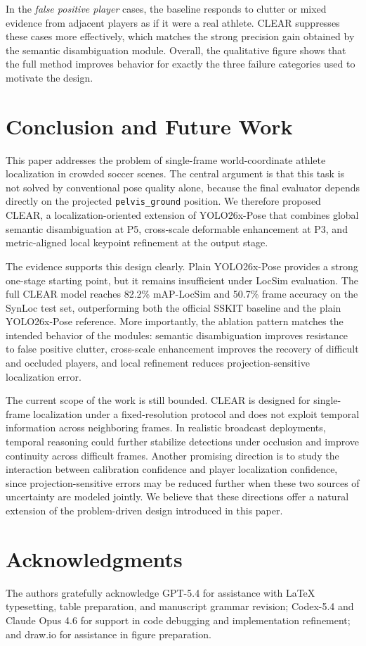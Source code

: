 \documentclass[runningheads]{llncs}
\begin{document}
In the \emph{false positive player} cases, the baseline responds to clutter or mixed evidence from adjacent players as if it were a real athlete. CLEAR suppresses these cases more effectively, which matches the strong precision gain obtained by the semantic disambiguation module. Overall, the qualitative figure shows that the full method improves behavior for exactly the three failure categories used to motivate the design.

\section{Conclusion and Future Work}
\label{sec:conclusion}

This paper addresses the problem of single-frame world-coordinate athlete localization in crowded soccer scenes. The central argument is that this task is not solved by conventional pose quality alone, because the final evaluator depends directly on the projected \texttt{pelvis\_ground} position. We therefore proposed CLEAR, a localization-oriented extension of YOLO26x-Pose that combines global semantic disambiguation at P5, cross-scale deformable enhancement at P3, and metric-aligned local keypoint refinement at the output stage.

The evidence supports this design clearly. Plain YOLO26x-Pose provides a strong one-stage starting point, but it remains insufficient under LocSim evaluation. The full CLEAR model reaches 82.2\% mAP-LocSim and 50.7\% frame accuracy on the SynLoc test set, outperforming both the official SSKIT baseline and the plain YOLO26x-Pose reference. More importantly, the ablation pattern matches the intended behavior of the modules: semantic disambiguation improves resistance to false positive clutter, cross-scale enhancement improves the recovery of difficult and occluded players, and local refinement reduces projection-sensitive localization error.

The current scope of the work is still bounded. CLEAR is designed for single-frame localization under a fixed-resolution protocol and does not exploit temporal information across neighboring frames. In realistic broadcast deployments, temporal reasoning could further stabilize detections under occlusion and improve continuity across difficult frames. Another promising direction is to study the interaction between calibration confidence and player localization confidence, since projection-sensitive errors may be reduced further when these two sources of uncertainty are modeled jointly. We believe that these directions offer a natural extension of the problem-driven design introduced in this paper.

\section*{Acknowledgments}
The authors gratefully acknowledge GPT-5.4 for assistance with LaTeX typesetting, table preparation, and manuscript grammar revision; Codex-5.4 and Claude Opus 4.6 for support in code debugging and implementation refinement; and draw.io for assistance in figure preparation.



\end{document}
